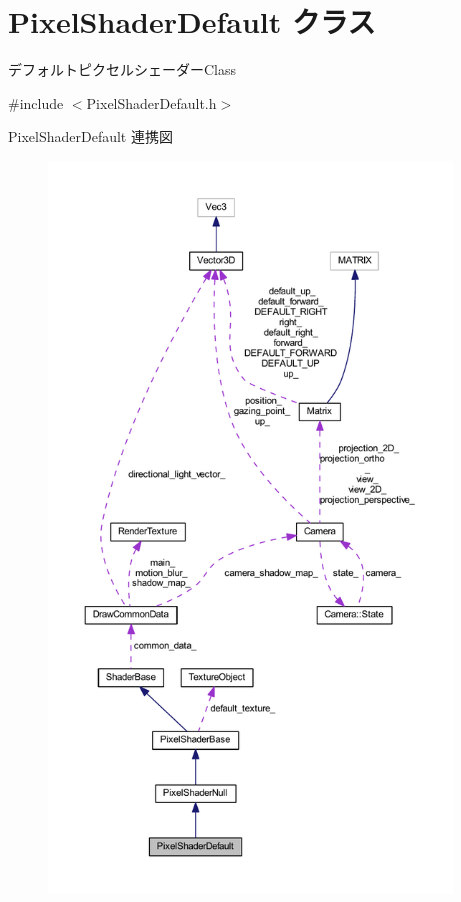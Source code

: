 \hypertarget{class_pixel_shader_default}{}\section{Pixel\+Shader\+Default クラス}
\label{class_pixel_shader_default}


デフォルトピクセルシェーダー\+Class  




{\ttfamily \#include $<$Pixel\+Shader\+Default.\+h$>$}



Pixel\+Shader\+Default 連携図\nopagebreak
\begin{figure}[H]
\begin{center}
\leavevmode
\includegraphics[height=550pt]{class_pixel_shader_default__coll__graph}
\end{center}
\end{figure}
